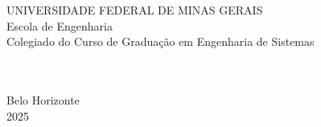 
\begin{titlepage}

    \begin{center}
        \begin{spacing}{1}
            UNIVERSIDADE FEDERAL DE MINAS GERAIS \\
            Escola de Engenharia \\
            Colegiado do Curso de Graduação em Engenharia de Sistemas \\ %
        \end{spacing}
        \vspace{5cm}
        \theauthor \\
        \vspace{5cm}
        \textbf{\MakeUppercase\thetitle}\\ %
        \vspace*{\fill}
        Belo Horizonte\\2025
    \end{center}

\end{titlepage}